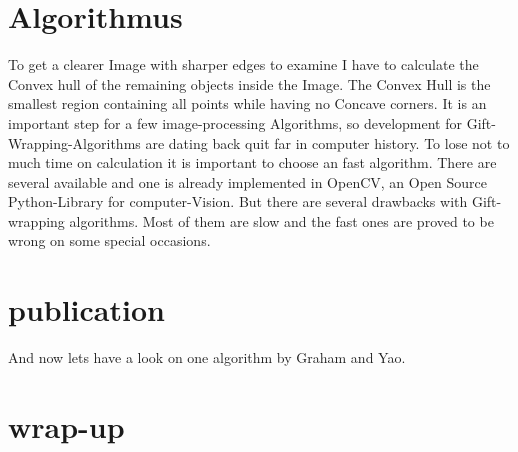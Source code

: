 \documentclass[10pt,a4paper]{article}
\begin{document}
	\section{Algorithmus}
	To get a clearer Image with sharper edges to examine I have to calculate the Convex hull of the remaining objects inside the Image.
	The Convex Hull is the smallest region containing all points while having no Concave corners.
	It is an important step for a few image-processing Algorithms, so development for  Gift-Wrapping-Algorithms are dating back quit far in computer history.	
	To lose not to much time on calculation it is important to choose an fast algorithm.
	There are several available and one is already implemented in OpenCV, an Open Source Python-Library for computer-Vision.
	But there are several drawbacks with Gift-wrapping algorithms.
	Most of them are slow and the fast ones are proved to be wrong on some special occasions.
	
	\section{publication}
	And now lets have a look on one algorithm by Graham and Yao.
	
	\section{wrap-up}
	
\end{document}
